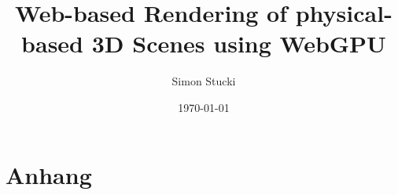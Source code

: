 \documentclass[a4paper, 11pt,abstract=on, listof=totocnumbered]{scrreprt}
\title{Web-based Rendering of physical-based 3D Scenes using WebGPU}
\author{Simon Stucki}
\date{\today}
\begin{document}
% 

\clearpage
\setcounter{page}{1}

%
%

%

%


%

%

%

%

%

%

\appendix
\chapter{Anhang}
\label{ch:anhang}
%
\end{document}
